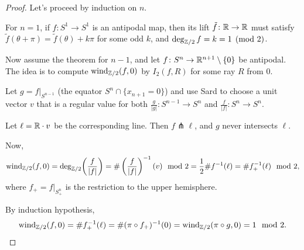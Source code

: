 \begin{proof}
    Let's proceed by induction on $n$.

    For $n = 1$, if $f \colon S^1 \to S^1$ is an antipodal map, then its lift $\tilde{f} \colon \mathbb{R} \to \mathbb{R}$ must satisfy $\tilde{f}(\theta + \pi) = \tilde{f}(\theta) + k\pi$ for some odd $k$, and $\deg_{\mathbb{Z}/2} f = k = 1 \pmod{2}$.

    Now assume the theorem for $n - 1$, and let $f \colon S^n \to \mathbb{R}^{n+1} \setminus \{0\}$ be antipodal. The idea is to compute $\operatorname{wind}_{\mathbb{Z}/2}(f, 0)$ by $I_2(f, R)$ for some ray $R$ from $0$.

    Let $g = f|_{S^{n-1}}$ (the equator $S^n \cap \{x_{n+1} = 0\}$) and use Sard to choose a unit vector $v$ that is a regular value for both $\frac{g}{|g|} \colon S^{n-1} \to S^n$ and $\frac{f}{|f|} \colon S^n \to S^n$.

    Let $\ell = \mathbb{R} \cdot v$ be the corresponding line. Then $f \pitchfork \ell$, and $g$ never intersects $\ell$.

    Now,
    \[
        \operatorname{wind}_{\mathbb{Z}/2}(f, 0) = \deg_{\mathbb{Z}/2}\!\left(\frac{f}{|f|}\right) = \#\left(\frac{f}{|f|}\right)^{-1}(v) \mod 2 = \frac{1}{2} \# f^{-1}(\ell) = \# f_+^{-1}(\ell) \mod 2,
    \]
    where $f_+ = f|_{S^n_+}$ is the restriction to the upper hemisphere.

    \begin{center}
    \end{center}

    By induction hypothesis,
    \[
        \operatorname{wind}_{\mathbb{Z}/2}(f, 0) = \# f_+^{-1}(\ell) = \#(\pi \circ f_+)^{-1}(0) = \operatorname{wind}_{\mathbb{Z}/2}\!\left(\pi \circ g, 0\right) = 1 \mod 2.
    \]
\end{proof}

